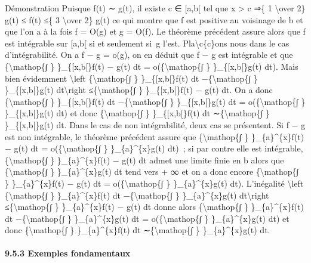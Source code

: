 \documentclass[]{article}
\begin{document}
Démonstration Puisque f(t) ∼ g(t), il existe c ∈ {[}a,b{[} tel que x
\textgreater{} c ⇒\{ 1 \textbackslash{}over 2\} g(t) ≤ f(t) ≤\{ 3
\textbackslash{}over 2\} g(t) ce qui montre que f est positive au
voisinage de b et que l'on a à la fois f = O(g) et g = O(f). Le théorème
précédent assure alors que f est intégrable sur {[}a,b{[} si et
seulement si~g l'est. Pla\textbackslash{}c\{c\}ons nous dans le cas
d'intégrabilité. On a \textbar{}f − g\textbar{} = o(g), on en déduit que
\textbar{}f − g\textbar{} est intégrable et que
\{\textbackslash{}mathop\{∫ \} \}\_\{{[}x,b{[}\}\textbar{}f(t) −
g(t)\textbar{} dt = o(\{\textbackslash{}mathop\{∫ \}
\}\_\{{[}x,b{[}\}g(t) dt). Mais bien évidemment \textbackslash{}left
\textbar{}\{\textbackslash{}mathop\{∫ \} \}\_\{{[}x,b{[}\}f(t) dt
−\{\textbackslash{}mathop\{∫ \} \}\_\{{[}x,b{[}\}g(t)
dt\textbackslash{}right \textbar{}≤\{\textbackslash{}mathop\{∫ \}
\}\_\{{[}x,b{[}\}\textbar{}f(t) − g(t)\textbar{} dt. On a donc
\{\textbackslash{}mathop\{∫ \} \}\_\{{[}x,b{[}\}f(t) dt
−\{\textbackslash{}mathop\{∫ \} \}\_\{{[}x,b{[}\}g(t) dt =
o(\{\textbackslash{}mathop\{∫ \} \}\_\{{[}x,b{[}\}g(t) dt) et donc
\{\textbackslash{}mathop\{∫ \} \}\_\{{[}x,b{[}\}f(t) dt
∼\{\textbackslash{}mathop\{∫ \} \}\_\{{[}x,b{[}\}g(t) dt. Dans le cas de
non intégrabilité, deux cas se présentent. Si \textbar{}f − g\textbar{}
est non intégrable, le théorème précédent assure que
\{\textbackslash{}mathop\{∫ \} \}\_\{a\}\^{}\{x\}\textbar{}f(t) −
g(t)\textbar{} dt = o(\{\textbackslash{}mathop\{∫ \}
\}\_\{a\}\^{}\{x\}g(t) dt)~; si par contre elle est intégrable,
\{\textbackslash{}mathop\{∫ \} \}\_\{a\}\^{}\{x\}\textbar{}f(t) −
g(t)\textbar{} dt admet une limite finie en b alors que
\{\textbackslash{}mathop\{∫ \} \}\_\{a\}\^{}\{x\}g(t) dt tend vers + ∞
et on a donc encore \{\textbackslash{}mathop\{∫ \}
\}\_\{a\}\^{}\{x\}\textbar{}f(t) − g(t)\textbar{} dt =
o(\{\textbackslash{}mathop\{∫ \} \}\_\{a\}\^{}\{x\}g(t) dt). L'inégalité
\textbackslash{}left \textbar{}\{\textbackslash{}mathop\{∫ \}
\}\_\{a\}\^{}\{x\}f(t) dt −\{\textbackslash{}mathop\{∫ \}
\}\_\{a\}\^{}\{x\}g(t) dt\textbackslash{}right
\textbar{}≤\{\textbackslash{}mathop\{∫ \}
\}\_\{a\}\^{}\{x\}\textbar{}f(t) − g(t)\textbar{} dt donne alors
\{\textbackslash{}mathop\{∫ \} \}\_\{a\}\^{}\{x\}f(t) dt
−\{\textbackslash{}mathop\{∫ \} \}\_\{a\}\^{}\{x\}g(t) dt =
o(\{\textbackslash{}mathop\{∫ \} \}\_\{a\}\^{}\{x\}g(t) dt) et donc
\{\textbackslash{}mathop\{∫ \} \}\_\{a\}\^{}\{x\}f(t) dt
∼\{\textbackslash{}mathop\{∫ \} \}\_\{a\}\^{}\{x\}g(t) dt.

\paragraph{9.5.3 Exemples fondamentaux}
\end{document}
